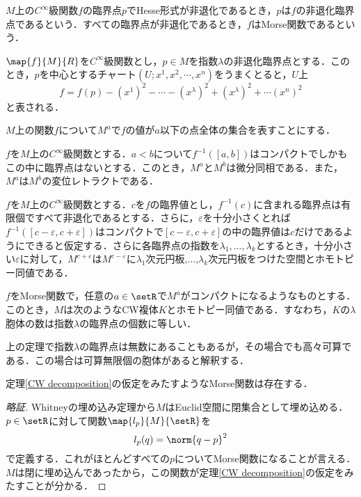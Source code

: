 \documentclass[uplatex]{jsarticle}
\begin{document}
\begin{definition}
$M$上の$C^{\infty}$級関数$f$の臨界点$p$でHesse形式が非退化であるとき，$p$は$f$の非退化臨界点であるという．すべての臨界点が非退化であるとき，$f$はMorse関数であるという．
\end{definition}

\begin{theorem}[Morseの補題]
$\map{f}{M}{R}$を$C^{\infty}$級関数とし，$p\in M$を指数$\lambda$の非退化臨界点とする．このとき，$p$を中心とするチャート$(U;x^1,x^2,\cdots,x^n)$をうまくとると，$U$上
\[ f = f(p)-(x^1)^2-\cdots -(x^{\lambda})^2+(x^{\lambda})^2+\cdots (x^n)^2 \]
と表される．
\end{theorem}

$M$上の関数$f$について$M^a$で$f$の値が$a$以下の点全体の集合を表すことにする．

\begin{theorem}
$f$を$M$上の$C^{\infty}$級関数とする．$a<b$について$f^{-1}([a,b])$はコンパクトでしかもこの中に臨界点はないとする．このとき，$M^a$と$M^b$は微分同相である．また，$M^a$は$M^b$の変位レトラクトである．
\end{theorem}

\begin{theorem}
$f$を$M$上の$C^{\infty}$級関数とする．$c$を$f$の臨界値とし，$f^{-1}(c)$に含まれる臨界点は有限個ですべて非退化であるとする．さらに，$\varepsilon$を十分小さくとれば$f^{-1}([c-\varepsilon,c+\varepsilon])$はコンパクトで$[c-\varepsilon,c+\varepsilon]$の中の臨界値は$c$だけであるようにできると仮定する．さらに各臨界点の指数を$\lambda_1,\dots,\lambda_k$とするとき，十分小さい$\varepsilon$に対して，$M^{c+\varepsilon}$は$M^{c-\varepsilon}$に$\lambda_1$次元円板,$\dots$,$\lambda_k$次元円板をつけた空間とホモトピー同値である．
\end{theorem}

\begin{theorem}\label{CW decomposition}
$f$をMorse関数で，任意の$a\in \setR$で$M^a$がコンパクトになるようなものとする．このとき，$M$は次のようなCW複体$K$とホモトピー同値である．すなわち，$K$の$\lambda$胞体の数は指数$\lambda$の臨界点の個数に等しい．
\end{theorem}

\begin{remark}
上の定理で指数$\lambda$の臨界点は無数にあることもあるが，その場合でも高々可算である．この場合は可算無限個の胞体があると解釈する．
\end{remark}

\begin{theorem}[Morse関数の存在]
定理\ref{CW decomposition}の仮定をみたすようなMorse関数は存在する．
\end{theorem}
\begin{proof}[略証]
Whitneyの埋め込み定理から$M$はEuclid空間に閉集合として埋め込める．$p\in \setR$に対して関数$\map{l_p}{M}{\setR}$を
\[ l_p(q) = \norm{q-p}^2 \]
で定義する．これがほとんどすべての$p$についてMorse関数になることが言える．$M$は閉に埋め込んであったから，この関数が定理\ref{CW decomposition}の仮定をみたすことが分かる．
\end{proof}
\end{document}
